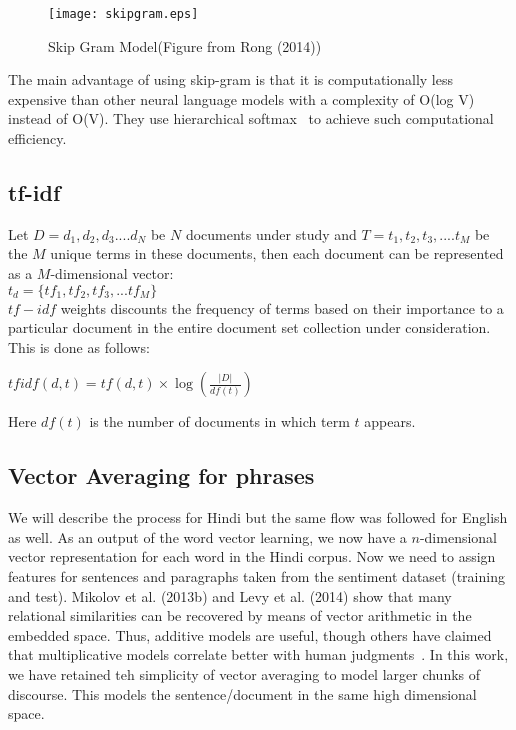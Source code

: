 \begin{figure}[H]
\centering
\texttt{[image: skipgram.eps]}
\caption{Skip Gram Model(Figure from Rong (2014)) \label{fig:skipgram}}
\end{figure}
The main advantage of using skip-gram is that it is computationally less expensive than other neural language models with a complexity of O(log V) instead of O(V). They use hierarchical softmax~\cite{Morin:05} to achieve such computational efficiency.

\subsection{tf-idf}
\label{subsec:tfidf}
Let $D=d_1, d_2, d_3....d_N$ be $N$ documents under study and $T=t_1, t_2, t_3,....t_M$ be the $M$ unique terms in these documents, then each document can be represented as a $M$-dimensional vector:\\
$t_d=\{tf_1,tf_2,tf_3,...tf_M\}$\\
$tf-idf$ weights discounts the frequency of terms based on their importance to a particular document in the entire document set collection under consideration. This is done as follows:
\begin{center}
$tfidf(d,t)=tf(d,t) \times \log(\frac{|D|}{df(t)})$ 
\end{center}
Here $df(t)$ is the number of documents in which term $t$ appears.

\subsection{Vector Averaging for phrases}
\label{sec:vectoraveraging}
We will describe the process for Hindi but the same flow was followed for English as well.
As an output of the word vector learning, we now have a $n$-dimensional
vector representation for each word in the Hindi corpus.  Now we need to
assign features for sentences and paragraphs taken from the sentiment dataset
(training and test).  Mikolov et al. (2013b) and Levy et al. (2014) show that
many relational similarities can be recovered by means of vector arithmetic
in the embedded space.  Thus, additive models are useful, though
others have claimed that multiplicative models correlate better with human
judgments~\cite{Mitchell:08,Socher:13}.  In this work, we have retained teh
simplicity of vector averaging to model larger chunks of  discourse.
This models the sentence/document in the same high dimensional space.

